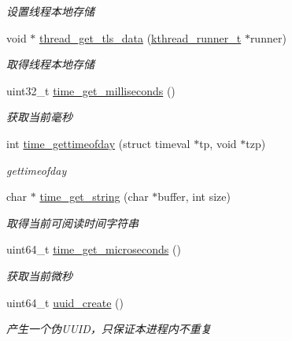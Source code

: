 \begin{DoxyCompactItemize}
\begin{DoxyCompactList}\small\item\em 设置线程本地存储 \end{DoxyCompactList}\item 
void $\ast$ \hyperlink{a00112_gaf5bb2dd001c42fdbdcdcb2048f76ae89_gaf5bb2dd001c42fdbdcdcb2048f76ae89}{thread\+\_\+get\+\_\+tls\+\_\+data} (\hyperlink{a00053_a4f78c259c9527c821f1a6f87495dd339_a4f78c259c9527c821f1a6f87495dd339}{kthread\+\_\+runner\+\_\+t} $\ast$runner)
\begin{DoxyCompactList}\small\item\em 取得线程本地存储 \end{DoxyCompactList}\item 
uint32\+\_\+t \hyperlink{a00084_a528d27a7218cb2fdabf81ca343e24fc9_a528d27a7218cb2fdabf81ca343e24fc9}{time\+\_\+get\+\_\+milliseconds} ()
\begin{DoxyCompactList}\small\item\em 获取当前毫秒 \end{DoxyCompactList}\item 
int \hyperlink{a00084_a3cab12b4908938ca999206a67c8ee032_a3cab12b4908938ca999206a67c8ee032}{time\+\_\+gettimeofday} (struct timeval $\ast$tp, void $\ast$tzp)
\begin{DoxyCompactList}\small\item\em gettimeofday \end{DoxyCompactList}\item 
char $\ast$ \hyperlink{a00084_a6d3f7fda67a3c61f767f7b2dbfcbe4ee_a6d3f7fda67a3c61f767f7b2dbfcbe4ee}{time\+\_\+get\+\_\+string} (char $\ast$buffer, int size)
\begin{DoxyCompactList}\small\item\em 取得当前可阅读时间字符串 \end{DoxyCompactList}\item 
uint64\+\_\+t \hyperlink{a00084_a5eb6de730bc28be3fbc402b9841c1819_a5eb6de730bc28be3fbc402b9841c1819}{time\+\_\+get\+\_\+microseconds} ()
\begin{DoxyCompactList}\small\item\em 获取当前微秒 \end{DoxyCompactList}\item 
uint64\+\_\+t \hyperlink{a00084_a2b1df51bc127460a3bf25949068bfe92_a2b1df51bc127460a3bf25949068bfe92}{uuid\+\_\+create} ()
\begin{DoxyCompactList}\small\item\em 产生一个伪\+U\+U\+I\+D，只保证本进程内不重复 \end{DoxyCompactList}\item 

\end{DoxyCompactItemize}
